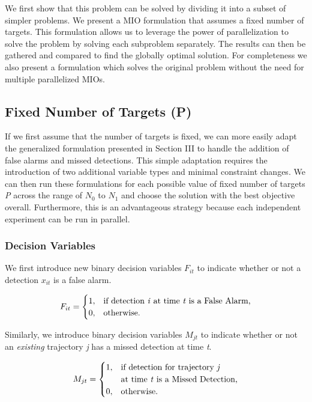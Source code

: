 \documentclass[journal]{IEEEtran}
\begin{document}
We first show that this problem can be solved by dividing it into a subset of simpler problems. We present a MIO formulation that assumes a fixed number of targets. This formulation allows us to leverage the power of parallelization to solve the problem by solving each subproblem separately. The results can then be gathered and compared to find the globally optimal solution. For completeness we also present a formulation which solves the original problem without the need for multiple parallelized MIOs.

\subsection{Fixed Number of Targets (P)}
If we first assume that the number of targets is fixed, we can more easily adapt the generalized formulation presented in Section III to handle the addition of false alarms and missed detections. This simple adaptation requires the introduction of two additional variable types and minimal constraint changes. We can then run these formulations for each possible value of fixed number of targets \textit{P} across the range of $N_{0}$ to $N_{1}$ and choose the solution with the best objective overall. Furthermore, this is an advantageous strategy because each independent experiment can be run in parallel. 

\subsubsection{Decision Variables}

We first introduce new binary decision variables $F_{it}$ to indicate whether or not a detection $x_{it}$ is a false alarm. 

\[F_{it} = 
\begin{cases}
1, & \text{if detection \textit{i} at time \textit{t} is a False Alarm,}\\
0, & \text{otherwise.}
\end{cases}\]

Similarly, we introduce binary decision variables $M_{jt}$ to indicate whether or not an \textit{existing} trajectory \textit{j} has a missed detection at time \textit{t}.

\[M_{jt} =
\begin{cases}
1, & \text{if detection for trajectory \textit{j}}\\
   &\text{at time \textit{t} is a Missed Detection,}\\
0, & \text{otherwise.}
\end{cases}\]
\end{document}
